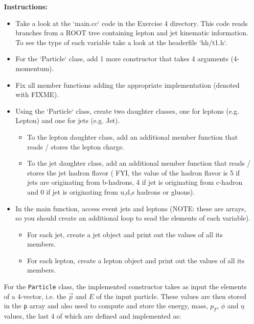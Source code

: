 \documentclass{article}
\newcounter{exercise}
\newenvironment{exr}[1]{%
    \refstepcounter{exercise}
    \begin{tcolorbox}[colback=blue!5!white, colframe=blue!75!black, title=Exercise \theexercise]
    \textbf{Instructions:} #1
    \end{tcolorbox}
    \vspace{1em}
}{}
\begin{document}
\begin{exr}{
    \begin{itemize}
        \item Take a look at the `main.cc` code in the Exercise 4 directory. This code reads branches from a ROOT tree containing lepton and jet kinematic information. To see the type of each variable take a look at the headerfile `hh/t1.h`.
        \item For the `Particle` class, add 1 more constructor that takes 4 arguments (4-momentum).
        \item Fix all member functions adding the appropriate implementation (denoted with FIXME).
        \item Using the `Particle` class, create two daughter classes, one for leptons (e.g. Lepton) and one for jets (e.g. Jet).
        \begin{itemize}
            \item To the lepton daughter class, add an additional member function that reads / stores the lepton charge.
            \item To the jet daughter class, add an additional member function that reads / stores the jet hadron flavor ( FYI, the value of the hadron flavor is 5 if jets are originating from b-hadrons, 4 if jet is originating from c-hadron and 0 if jet is originating from u,d,s hadrons or gluons).
        \end{itemize}
        \item In the main function, access event jets and leptons (NOTE: these are arrays, so you should create an additional loop to sead the elements of each variable).
        \begin{itemize}
            \item For each jet, create a jet object and print out the values of all its members.
            \item For each lepton, create a lepton object and print out the values of all its members.
        \end{itemize}
    \end{itemize}
    }
\end{exr}

For the \texttt{Particle} class, the implemented constructor takes as input the elements of a 4-vector, i.e. the $\vec p$ and $E$ of the input particle. These values are then stored in the \texttt{p} array and also used to compute and store the energy, mass, $p_T$, $\phi$ and $\eta$ values, the last 4 of which are defined and implemented as:
\end{document}
